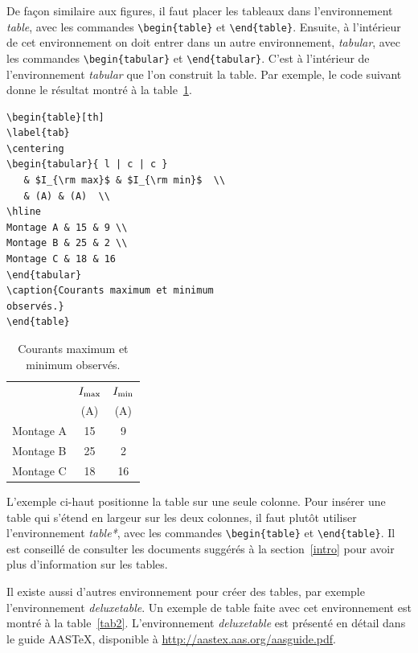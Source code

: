 \documentclass[10pt,letterpaper,twocolumn]{article}
\begin{document}
De façon similaire aux figures, il faut placer les tableaux dans l'environnement {\em table}, avec les commandes \verb+\begin{table}+ et \verb+\end{table}+. Ensuite, à l'intérieur de cet environnement on doit entrer dans un autre environnement, {\em tabular}, avec les commandes \verb+\begin{tabular}+ et \verb+\end{tabular}+. C'est à l'intérieur de l'environnement {\em tabular} que l'on construit la table. Par exemple, le code suivant donne le résultat montré à la table~\ref{tab}.
\begin{verbatim}
\begin{table}[th]
\label{tab}
\centering
\begin{tabular}{ l | c | c }
   & $I_{\rm max}$ & $I_{\rm min}$  \\
   & (A) & (A)  \\
\hline
Montage A & 15 & 9 \\
Montage B & 25 & 2 \\
Montage C & 18 & 16
\end{tabular}
\caption{Courants maximum et minimum
observés.}
\end{table}
\end{verbatim}

\begin{table}[th]
\centering
\begin{tabular}{ l | c | c }
   & $I_{\rm max}$ & $I_{\rm min}$  \\
   & (A) & (A)  \\
\hline
Montage A & 15 & 9 \\
Montage B & 25 & 2 \\
Montage C & 18 & 16
\end{tabular}
\caption{\label{tab} Courants maximum et minimum observés.}
\end{table}

L'exemple ci-haut positionne la table sur une seule colonne. Pour insérer une table qui s'étend en largeur sur les deux colonnes, il faut plutôt utiliser l'environnement {\em table*}, avec les commandes \verb+\begin{table}+ et \verb+\end{table}+. Il est conseillé de consulter les documents suggérés à la section~\ref{intro} pour avoir plus d'information sur les tables.

Il existe aussi d'autres environnement pour créer des tables, par exemple l'environnement {\em deluxetable}. Un exemple de table faite avec cet environnement est montré à la table~\ref{tab2}. L'environnement {\em deluxetable} est présenté en détail dans le guide AASTeX, disponible à \url{http://aastex.aas.org/aasguide.pdf}.
\end{document}
